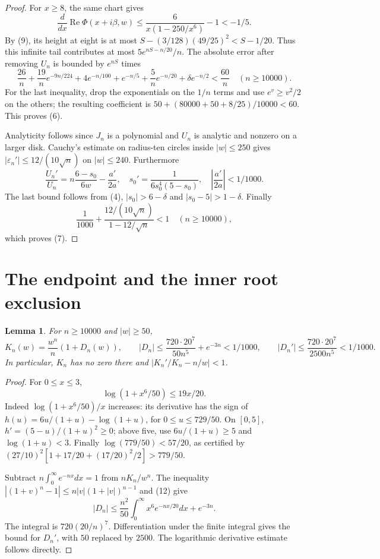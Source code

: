 \documentclass[11pt]{article}
\newtheorem{lemma}[theorem]{Lemma}
\begin{document}
\begin{proof}
For $x\ge8$, the same chart gives
\[
 \frac d{dx}\operatorname{Re}\Phi(x+i\beta,w)
 \le\frac6{x(1-250/x^6)}-1<-1/5.
\]
By (9), its height at eight is at most
$S-(3/128)(49/25)^2<S-1/20$. Thus this infinite tail contributes
at most $5e^{nS-n/20}/n$.
The absolute error after removing $U_n$ is bounded by $e^{nS}$ times
\[
 \frac{26}{n}+\frac{19}{n}e^{-9n/224}
 +4e^{-n/100}+e^{-n/5}+\frac5n e^{-n/20}
 +\delta e^{-n/2}<\frac{60}{n}\quad(n\ge10000).        \tag{10}
\]
For the last inequality, drop the exponentials on the $1/n$ terms
and use $e^v\ge v^2/2$ on the others; the resulting coefficient is
$50+(80000+50+8/25)/10000<60$. This proves (6).

Analyticity follows since $J_n$ is a polynomial and $U_n$ is analytic
and nonzero on a larger disk. Cauchy's estimate on radius-ten circles
inside $|w|\le250$ gives
$|\varepsilon_n'|\le12/(10\sqrt n)$ on $|w|\le240$.
Furthermore
\[
 \frac{U_n'}{U_n}=n\frac{6-s_0}{6w}-\frac{a'}{2a},\quad
 s_0'=\frac1{6s_0^4(5-s_0)},\quad
 \left|\frac{a'}{2a}\right|<1/1000.
\]
The last bound follows from (4), $|s_0|>6-\delta$ and
$|s_0-5|>1-\delta$. Finally
\[
 \frac1{1000}+
 \frac{12/(10\sqrt n)}{1-12/\sqrt n}<1\quad(n\ge10000),
\]
which proves (7).
\end{proof}

\section{The endpoint and the inner root exclusion}
\begin{lemma}\label{lem:K}
For $n\ge10000$ and $|w|\ge50$,
\[
 K_n(w)=\frac{w^n}{n}(1+D_n(w)),\qquad
 |D_n|\le\frac{720\cdot20^7}{50n^5}+e^{-3n}<1/1000,
 \qquad |D_n'|\le\frac{720\cdot20^7}{2500n^5}<1/1000.   \tag{11}
\]
In particular, $K_n$ has no zero there and
$|K_n'/K_n-n/w|<1$.
\end{lemma}
\begin{proof}
For $0\le x\le3$,
\[
                   \log(1+x^6/50)\le19x/20.            \tag{12}
\]
Indeed $\log(1+x^6/50)/x$ increases: its derivative has the sign of
$h(u)=6u/(1+u)-\log(1+u)$, for $0\le u\le729/50$.
On $[0,5]$, $h'=(5-u)/(1+u)^2\ge0$; above five, use
$6u/(1+u)\ge5$ and $\log(1+u)<3$. Finally
$\log(779/50)<57/20$, as certified by
$(27/10)^2[1+17/20+(17/20)^2/2]>779/50$.

Subtract $n\int_0^\infty e^{-nx}dx=1$ from
$nK_n/w^n$. The inequality
$|(1+v)^n-1|\le n|v|(1+|v|)^{n-1}$ and (12) give
\[
 |D_n|\le\frac{n^2}{50}\int_0^\infty x^6e^{-nx/20}dx+e^{-3n}.
\]
The integral is $720(20/n)^7$. Differentiation under the finite integral
gives the bound for $D_n'$, with $50$ replaced by $2500$.
The logarithmic derivative estimate follows directly.
\end{proof}
\end{document}
